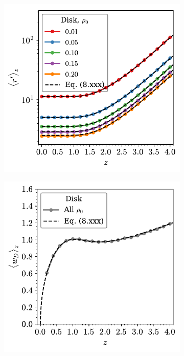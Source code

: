 \begin{figure}
     \begin{subfigure}[b]{0.48\textwidth}
         \centering
         \includegraphics[width=\textwidth]{./figures/quasi2d/d_z_3d_disk.pdf}
         \caption{}
         \label{fig:wdc}
     \end{subfigure}
     \hfill
      \begin{subfigure}[b]{0.48\textwidth}
         \centering
         \includegraphics[width=\textwidth]{./figures/quasi2d/w_z_3d_disk.pdf}
         \caption{}
         \label{fig:wdd}
     \end{subfigure}
     \hfill
	

\end{figure}

